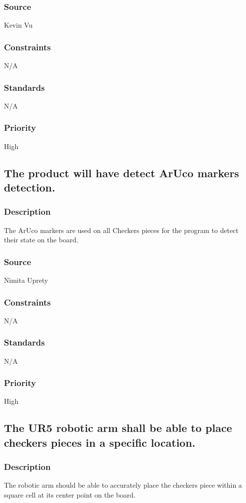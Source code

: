 \subsubsection{Source}
Kevin Vu
\subsubsection{Constraints}
N/A
\subsubsection{Standards}
N/A
\subsubsection{Priority}
High

\subsection{The product will have detect ArUco markers detection.}
\subsubsection{Description}
The ArUco markers are used on all Checkers pieces for the program to detect their state on the board.
\subsubsection{Source}
Nimita Uprety
\subsubsection{Constraints}
N/A
\subsubsection{Standards}
N/A
\subsubsection{Priority}
High

\subsection{The UR5 robotic arm shall be able to place checkers pieces in a specific location.}
\subsubsection{Description}
The robotic arm should be able to accurately place the checkers piece within a square cell at its center point on the board.
